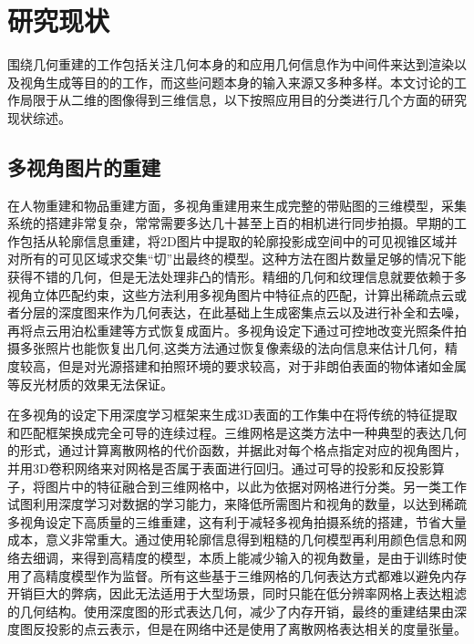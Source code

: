 \section{研究现状}
围绕几何重建的工作包括关注几何本身的和应用几何信息作为中间件来达到渲染以及视角生成等目的的工作，而这些问题本身的输入来源又多种多样。本文讨论的工作局限于从二维的图像得到三维信息，以下按照应用目的分类进行几个方面的研究现状综述。

\subsection{多视角图片的重建}
在人物重建和物品重建方面，多视角重建用来生成完整的带贴图的三维模型，采集系统的搭建非常复杂，常常需要多达几十甚至上百的相机进行同步拍摄。早期的工作包括从轮廓信息重建\citep{vlastic2008, furukawa2006, matusik2000ibvh}，将2D图片中提取的轮廓投影成空间中的可见视锥区域并对所有的可见区域求交集“切”出最终的模型。这种方法在图片数量足够的情况下能获得不错的几何，但是无法处理非凸的情形。精细的几何和纹理信息就要依赖于多视角立体匹配约束\citep{furukawa2010, starck2007, zitnick2004}，这些方法利用多视角图片中特征点的匹配，计算出稀疏点云或者分层的深度图来作为几何表达，在此基础上生成密集点云以及进行补全和去噪，再将点云用泊松重建\citep{kazhdan2013, kazhdan2006}等方式恢复成面片。多视角设定下通过可控地改变光照条件拍摄多张照片也能恢复出几何\citep{wu2012, vlasic2009},这类方法通过恢复像素级的法向信息来估计几何，精度较高，但是对光源搭建和拍照环境的要求较高，对于非朗伯表面的物体诸如金属等反光材质的效果无法保证。

在多视角的设定下用深度学习框架来生成3D表面的工作集中在将传统的特征提取和匹配框架换成完全可导的连续过程。三维网格是这类方法中一种典型的表达几何的形式，\citet{ji2017iccv}通过计算离散网格的代价函数，并据此对每个格点指定对应的视角图片，并用3D卷积网络来对网格是否属于表面进行回归。\citet{kar2017neurips}通过可导的投影和反投影算子，将图片中的特征融合到三维网格中，以此为依据对网格进行分类。另一类工作试图利用深度学习对数据的学习能力，来降低所需图片和视角的数量，以达到稀疏多视角设定下高质量的三维重建，这有利于减轻多视角拍摄系统的搭建，节省大量成本，意义非常重大。通过使用轮廓信息得到粗糙的几何模型再利用颜色信息和网络去细调，来得到高精度的模型\citep{Gilbert_2018_ECCV,huang2018eccv}，本质上能减少输入的视角数量，是由于训练时使用了高精度模型作为监督。所有这些基于三维网格的几何表达方式都难以避免内存开销巨大的弊病，因此无法适用于大型场景，同时只能在低分辨率网格上表达粗滤的几何结构。\citet{yao2018mvsnet}使用深度图的形式表达几何，减少了内存开销，最终的重建结果由深度图反投影的点云表示，但是在网络中还是使用了离散网格表达相关的度量张量。

